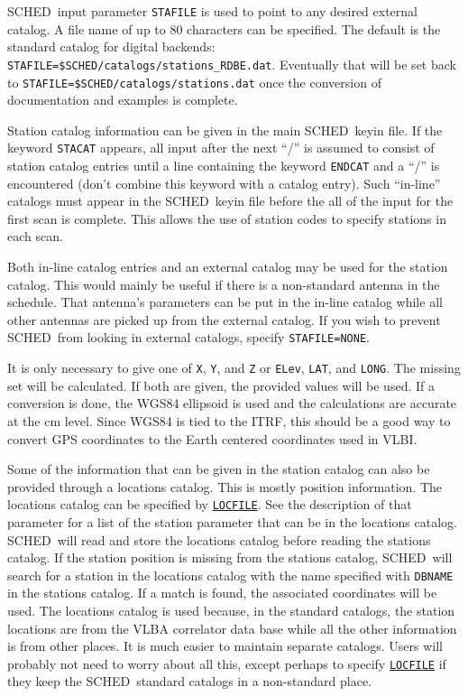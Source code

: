 \documentclass{report}
\newcommand{\schedb}{{\sc SCHED~}}
\begin{document}
\schedb input parameter {\tt STAFILE} is used to point to any desired
external catalog.  A file name of up to 80 characters can be
specified. The default is the standard catalog for digital backends:
\\ {\tt STAFILE=\$SCHED/catalogs/stations\_RDBE.dat}.  Eventually that
will be set back to {\tt STAFILE=\$SCHED/catalogs/stations.dat} once
the conversion of documentation and examples is complete.

Station catalog information can be given in the main \schedb keyin
file. If the keyword {\tt STACAT} appears, all input after the next
``/'' is assumed to consist of station catalog entries until a line
containing the keyword {\tt ENDCAT} and a ``/'' is encountered (don't
combine this keyword with a catalog entry).  Such ``in-line'' catalogs
must appear in the \schedb keyin file before the all of the input
for the first scan is complete.  This allows the use of station codes
to specify stations in each scan.

Both in-line catalog entries and an external catalog may be used for
the station catalog.  This would mainly be useful if there is a
non-standard antenna in the schedule.  That antenna's parameters can
be put in the in-line catalog while all other antennas are picked up
from the external catalog.  If you wish to prevent \schedb from
looking in external catalogs, specify {\tt STAFILE=NONE}.

It is only necessary to give one of {\tt X}, {\tt Y}, and {\tt Z} or
{\tt ELev}, {\tt LAT}, and {\tt LONG}.  The missing set will be
calculated.  If both are given, the provided values will be used.  If
a conversion is done, the WGS84 ellipsoid is used and the calculations
are accurate at the cm level.  Since WGS84 is tied to the ITRF, this
should be a good way to convert GPS coordinates to the Earth centered
coordinates used in VLBI.

Some of the information that can be given in the station catalog can
also be provided through a locations catalog.  This is mostly position
information.  The locations catalog can be specified by 
{\hyperref[MP:LOCFILE]{{\tt LOCFILE}}}.
See the description of that parameter for a
list of the station parameter that can be in the locations catalog.
\schedb will read and store the locations catalog before reading the
stations catalog.  If the station position is missing from the
stations catalog, \schedb will search for a station in the locations
catalog with the name specified with {\tt DBNAME} in the stations
catalog.  If a match is found, the associated coordinates will be
used.  The locations catalog is used because, in the standard
catalogs, the station locations are from the VLBA correlator data base
while all the other information is from other places.  It is much
easier to maintain separate catalogs.  Users will probably not need to
worry about all this, except perhaps to specify 
{\hyperref[MP:LOCFILE]{{\tt LOCFILE}}}
if they keep the \schedb standard catalogs in a
non-standard place.
\end{document}
